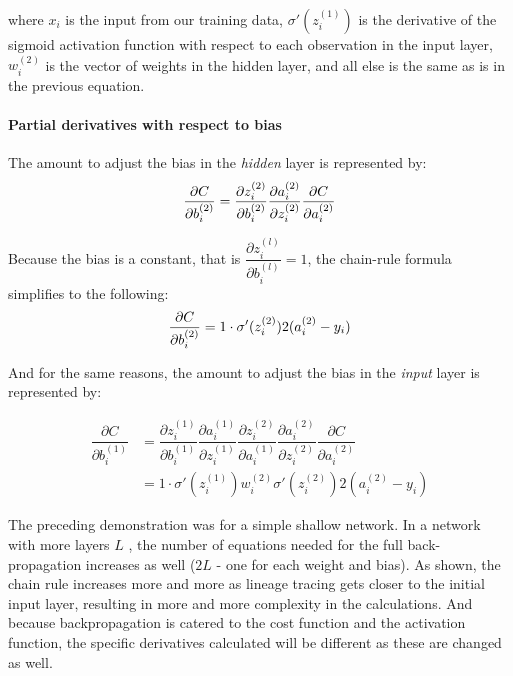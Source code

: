 where \(x_i\) is the input from our training data,
\(\sigma'(z_i^{(1)})\) is the derivative of the sigmoid activation
function with respect to each observation in the input layer,
\(w_i^{(2)}\) is the vector of weights in the hidden layer, and all else
is the same as is in the previous equation.


\hypertarget{partial-derivatives-with-respect-to-bias}{%
\paragraph{Partial derivatives with respect to
bias}\label{partial-derivatives-with-respect-to-bias}}

The amount to adjust the bias in the \emph{hidden} layer is
represented by: \[
\frac{\partial{C}}{\partial{b_i^{(2)}}}  =  \dfrac{\partial{z_i^{(2)}}}{\partial{b_i^{(2)}}}
     \dfrac{\partial{a_i^{(2)}}}{\partial{z_i^{(2)}}}
     \dfrac{\partial{C}}{\partial{a_i^{(2)}}} \\
\]

Because the bias is a constant, that is
\(\dfrac{\partial{z_i^{(l)}}}{\partial{b_i^{(l)}}} = 1\), the chain-rule
formula simplifies to the following: \[
\frac{\partial{C}}{\partial{b_i^{(2)}}} = 1 \cdot \sigma'(z_i^{(2)}) 2(a_i^{(2)}-y_i) \\
\]

And for the same reasons, the amount to adjust the bias in the \emph{input} layer is
represented by:

    \begin{align*}
\dfrac{\partial{C}}{\partial{b_i^{(1)}}} 
& = \dfrac{\partial{z_i^{(1)}}}{\partial{b_i^{(1)}}} \dfrac{\partial{a_i^{(1)}}}{\partial{z_i^{(1)}}}  \dfrac{\partial{z_i^{(2)}}}{\partial{a_i^{(1)}}}
     \dfrac{\partial{a_i^{(2)}}}{\partial{z_i^{(2)}}}
     \dfrac{\partial{C}}{\partial{a_i^{(2)}}} \\ \nonumber
& = 1 \cdot \sigma'(z_i^{(1)}) w_i^{(2)} \sigma'(z_i^{(2)}) 2(a_i^{(2)}-y_i) \nonumber
    \end{align*}


The preceding demonstration was for a simple shallow network.  In a network with more layers $L$ , the number of equations needed for the full back-propagation increases as well ($2L$ - one for each weight and bias).  As shown, the chain rule increases more and more as lineage tracing gets closer to the initial input layer, resulting in more and more complexity in the calculations.  And because backpropagation is catered to the cost function and the activation function, the specific derivatives calculated will be different as these are changed as well.


